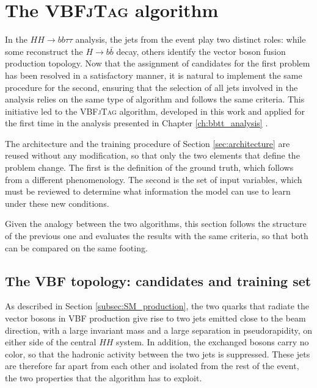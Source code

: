 \section{The \textsc{VBFjTag} algorithm}
\label{sec:VBFjTag}
%
In the $HH\to bb\tau\tau$ analysis, the jets from the event play two distinct roles: while some reconstruct the $H\to b\bar{b}$ decay, others identify the vector boson fusion production topology. Now that the assignment of candidates for the first problem has been resolved in a satisfactory manner, it is natural to implement the same procedure for the second, ensuring that the selection of all jets involved in the analysis relies on the same type of algorithm and follows the same criteria. This initiative led to the \textsc{VBFjTag} algorithm, developed in this work and applied for the first time in the analysis presented in Chapter \ref{ch:bbtt_analysis} \cite{CMS-PAS-HIG-25-008}.

The architecture and the training procedure of Section \ref{sec:architecture} are reused without any modification, so that only the two elements that define the problem change. The first is the definition of the ground truth, which follows from a different phenomenology. The second is the set of input variables, which must be reviewed to determine what information the model can use to learn under these new conditions.\medskip

Given the analogy between the two algorithms, this section follows the structure of the previous one and evaluates the results with the same criteria, so that both can be compared on the same footing.

\subsection{The VBF topology: candidates and training set}
\label{subsec:vbf_dataset}
%
As described in Section \ref{subsec:SM_production}, the two quarks that radiate the vector bosons in VBF production give rise to two jets emitted close to the beam direction, with a large invariant mass and a large separation in pseudorapidity, on either side of the central $HH$ system. In addition, the exchanged bosons carry no color, so that the hadronic activity between the two jets is suppressed. These jets are therefore far apart from each other and isolated from the rest of the event, the two properties that the algorithm has to exploit.\medskip

